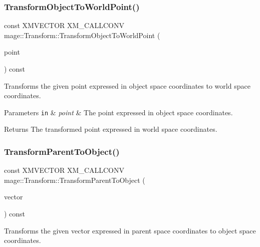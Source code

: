 \subsubsection{\texorpdfstring{Transform\+Object\+To\+World\+Point()}{TransformObjectToWorldPoint()}}
{\footnotesize\ttfamily const X\+M\+V\+E\+C\+T\+OR X\+M\+\_\+\+C\+A\+L\+L\+C\+O\+NV mage\+::\+Transform\+::\+Transform\+Object\+To\+World\+Point (\begin{DoxyParamCaption}\item[{F\+X\+M\+V\+E\+C\+T\+OR}]{point }\end{DoxyParamCaption}) const\hspace{0.3cm}{\ttfamily [noexcept]}}

Transforms the given point expressed in object space coordinates to world space coordinates.


\begin{DoxyParams}[1]{Parameters}
\mbox{\tt in}  & {\em point} & The point expressed in object space coordinates. \\
\hline
\end{DoxyParams}
\begin{DoxyReturn}{Returns}
The transformed point expressed in world space coordinates. 
\end{DoxyReturn}
\mbox{\label{classmage_1_1_transform_a305841f6bbc0a4eadaacbce2918b438c}} 
\subsubsection{\texorpdfstring{Transform\+Parent\+To\+Object()}{TransformParentToObject()}}
{\footnotesize\ttfamily const X\+M\+V\+E\+C\+T\+OR X\+M\+\_\+\+C\+A\+L\+L\+C\+O\+NV mage\+::\+Transform\+::\+Transform\+Parent\+To\+Object (\begin{DoxyParamCaption}\item[{F\+X\+M\+V\+E\+C\+T\+OR}]{vector }\end{DoxyParamCaption}) const\hspace{0.3cm}{\ttfamily [noexcept]}}

Transforms the given vector expressed in parent space coordinates to object space coordinates.


